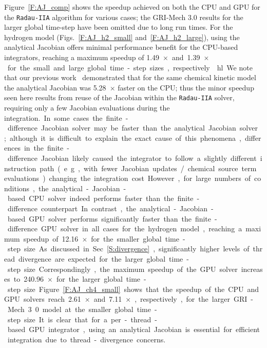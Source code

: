 \documentclass[preprint,review,11pt]{elsarticle}
\DeclareRobustCommand{\hlg}[1]{\sethlcolor{green}\hl{#1}}
\begin{document}
Figure~\ref{F:AJ_comp} shows the speedup achieved on both the CPU and GPU for the \texttt{Radau-IIA} algorithm for various cases; the GRI-Mech 3.0 results for the larger global time-step have been omitted due to long run times.
For the hydrogen model (Figs.~\ref{F:AJ_h2_small} and~\ref{F:AJ_h2_large}), using the analytical Jacobian offers minimal performance benefit for the CPU-based integrators, reaching a maximum speedup of \SI{1.49}{$\times$} and \SI{1.39}{$\times$} for the small and large global time-step sizes, respectively.
\hlg{We note that our previous work~\cite{Niemeyer:2016aa} demonstrated that for the same chemical kinetic model the analytical Jacobian was {\SI{5.28}{$\times$}} faster on the CPU; thus the minor speedup seen here results from reuse of the Jacobian within the \texttt{Radau-IIA} solver, requiring only a few Jacobian evaluations during the integration.}
In some cases the finite-difference Jacobian solver may be faster than the analytical Jacobian solver; although it is difficult to explain the exact cause of this phenomena, differences in the finite-difference Jacobian likely caused the integrator to follow a slightly different instruction path (e.g., with fewer Jacobian updates\slash chemical source term evaluations) changing the integration cost.
However, for large numbers of conditions, the analytical-Jacobian-based CPU solver indeed performs faster than the finite-difference counterpart.
In contrast, the analytical-Jacobian-based GPU solver performs significantly faster than the finite-difference GPU solver in all cases for the hydrogen model, reaching a maximum speedup of \SI{12.16}{$\times$} for the smaller global time-step size.
As discussed in Sec.~\ref{S:divergence}, significantly higher levels of thread divergence are expected for the larger global time-step size.
Correspondingly, the maximum speedup of the GPU solver increases to \SI{240.96}{$\times$} for the larger global time-step size.
Figure~\ref{F:AJ_ch4_small} shows that the speedup of the CPU and GPU solvers reach \SI{2.61}{$\times$} and \SI{7.11}{$\times$}, respectively, for the larger GRI-Mech 3.0 model at the smaller global time-step size.
It is clear that for a per-thread-based GPU integrator, using an analytical Jacobian is essential for efficient integration due to thread-divergence concerns.
\end{document}
